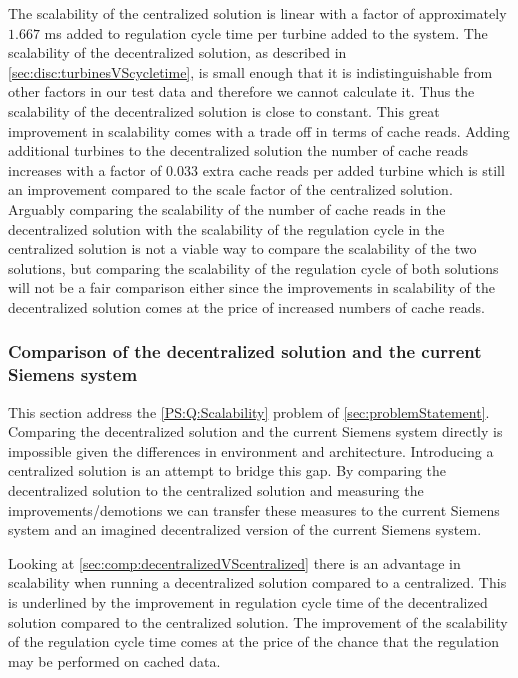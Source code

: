 The scalability of the centralized solution is linear with a factor of approximately $1.667$ ms added to regulation cycle time per turbine added to the system.
The scalability of the decentralized solution, as described in \cref{sec:disc:turbinesVScycletime}, is small enough that it is indistinguishable from other factors in our test data and therefore we cannot calculate it. Thus the scalability of the decentralized solution is close to constant. This great improvement in scalability comes with a trade off in terms of cache reads. Adding additional turbines to the decentralized solution the number of cache reads increases with a factor of $0.033$ extra cache reads per added turbine which is still an improvement compared to the scale factor of the centralized solution. Arguably comparing the scalability of the number of cache reads in the decentralized solution with the scalability of the regulation cycle in the centralized solution is not a viable way to compare the scalability of the two solutions, but comparing the scalability of the regulation cycle of both solutions will not be a fair comparison either since the improvements in scalability of the decentralized solution comes at the price of increased numbers of cache reads.

\subsubsection{Comparison of the decentralized solution and the current Siemens system}
This section address the \ref{PS:Q:Scalability} problem of \cref{sec:problemStatement}.
Comparing the decentralized solution and the current Siemens system directly is impossible given the differences in environment and architecture. Introducing a centralized solution is an attempt to bridge this gap. By comparing the decentralized solution to the centralized solution and measuring the improvements/demotions we can transfer these measures to the current Siemens system and an imagined decentralized version of the current Siemens system.

Looking at \cref{sec:comp:decentralizedVScentralized} there is an advantage in scalability when running a decentralized solution compared to a centralized. This is underlined by the improvement in regulation cycle time of the decentralized solution compared to the centralized solution. The improvement of the scalability of the regulation cycle time comes at the price of the chance that the regulation may be performed on cached data.

